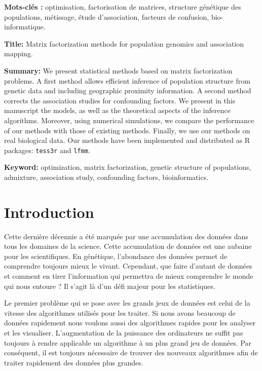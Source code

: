 \documentclass[12pt,a4paper,twoside]{ugathesis}
\begin{document}
\noindent \textbf{Mots-clés :} optimisation, factorisation de matrices, structure génétique des
populations, métissage, étude d'association, facteurs de confusion, bio-informatique.

\vspace{0.5cm}

\noindent \textbf{Title:} Matrix factorization methods for population genomics and association
mapping.

\noindent \textbf{Summary:} We present statistical methods based on matrix
factorization problems. A first method allows efficient inference of population
structure from genetic data and including geographic proximity information. A
second method corrects the association studies for confounding factors. We
present in this manuscript the models, as well as the theoretical aspects of the
inference algorithms. Moreover, using numerical simulations, we compare the
performance of our methods with those of existing methods. Finally, we use our
methods on real biological data. Our methods have been implemented and
distributed as R packages: \texttt{tess3r} and \texttt{lfmm}.

\noindent \textbf{Keyword:} optimization, matrix factorization, genetic structure of populations,
admixture, association study,  confounding factors, bioinformatics.
\mainmatter

\chapter{Introduction}
\label{sec:org82a7bf5}
Cette dernière décennie a été marquée par une accumulation des données dans tous
les domaines de la science. Cette accumulation de données est une aubaine pour
les scientifiques. En génétique, l'abondance des données permet de comprendre
toujours mieux le vivant. Cependant, que faire d'autant de données et comment en
tirer l'information qui permettra de mieux comprendre le monde qui nous entoure
? Il s'agit là d'un défi majeur pour les statistiques.

Le premier problème qui se pose avec les grands jeux de données est celui de la
vitesse des algorithmes utilisés pour les traiter. Si nous avons beaucoup de
données rapidement nous voulons aussi des algorithmes rapides pour les analyser
et les visualiser. L'augmentation de la puissance des ordinateurs ne suffit pas
toujours à rendre applicable un algorithme à un plus grand jeu de données. Par
conséquent, il est toujours nécessaire de trouver des nouveaux algorithmes afin
de traiter rapidement des données plus grandes.
\end{document}

